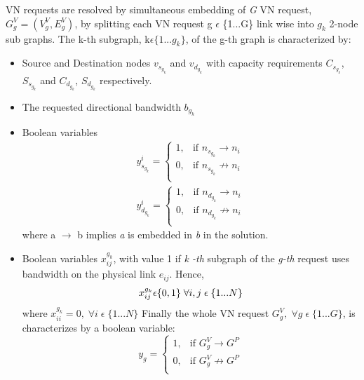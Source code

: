 \documentclass[article,dr=phil,type=msc ,colorback,accentcolor=tud4b]{tudthesis}
\begin{document}
\begin{enumerate}[label=(\Alph*)]
	VN requests are resolved by simultaneous embedding of \textit{G} VN request, \textit{$G_{g}^{V}= (V_{g}^{V}, E_{g}^{V})$}, by splitting each VN request g $\epsilon$ \{1...G\} link wise into $g_{k}$ 2-node sub graphs. The k-th subgraph, k\;$\epsilon\{1...g_{k}\}$, of the g-th graph is characterized by: 
	\begin{itemize}
		\item Source and Destination nodes  \textit{$v_{s_{g_{k}}}$} and   \textit{$v_{d_{g_{k}}}$} with capacity requirements \textit{$C_{s_{g_{k}}}$}, \textit{$S_{s_{g_{k}}}$} and \textit{$C_{d_{g_{k}}}$}, \textit{$S_{d_{g_{k}}}$} respectively.
		\item The requested directional bandwidth \textit{$b_{g_{k}}$}
		\item  Boolean variables
		\begin{equation} \label{bl_var}
		\begin{split}
		y_{s_{g_{k}}}^{i}=
		\begin{cases}
		1, & \text{if } n_{s_{g_{k}}}\rightarrow n_{i} \\
		0, & \text{if } n_{s_{g_{k}}}\not\rightarrow n_{i} \\
		\end{cases}\\
		y_{d_{g_{k}}}^{i}=
		\begin{cases}
		1, & \text{if } n_{d_{g_{k}}}\rightarrow n_{i} \\
		0, & \text{if } n_{d_{g_{k}}} \not\rightarrow n_{i} \\
		\end{cases}
		\end{split}
		\end{equation}
		where a $\rightarrow$ b implies \textit{a} is embedded in \textit{b} in the solution.
		
		\item Boolean variables $x_{ij}^{g_{k}}$, with value 1 if \textit{k -th} subgraph of the \textit{g-th} request uses bandwidth on the physical link $e_{ij}$. Hence, 
		\begin{equation}
		x_{ij}^{g_{k}} \epsilon \{0, 1\} \;\forall i, j \;\epsilon\; \{1...N\}\\
		\end{equation}
		where $x_{ii}^{g_{k}} = 0, \; \forall i \;\epsilon\; \{1...N\}$\newline
		Finally the whole VN request  $G_{g}^{V}, \; \forall g \;\epsilon\; \{1...G\}$, is characterizes by a boolean variable:
		\begin{equation} \label{bl_var1}
		y_{g}=
		\begin{cases}
		1, & \text{if }   G_{g}^{V}\rightarrow G^{P} \\
		0, & \text{if }   G_{g}^{V}\not\rightarrow G^{P} \\
		\end{cases}
		\end{equation}
	\end{itemize}
	

\end{enumerate}
\end{document}
